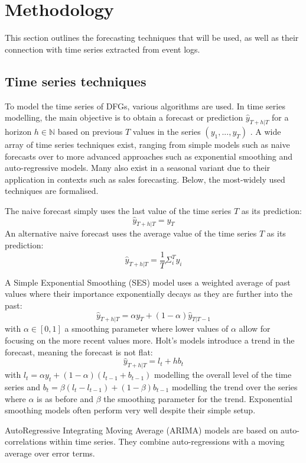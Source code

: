 \section{Methodology}\label{sec:methodology}
This section outlines the forecasting techniques that will be used, as well as their connection with time series extracted from event logs.

\subsection{Time series techniques}
To model the time series of DFGs, various algorithms are used.
In time series modelling, the main objective is to obtain a forecast or prediction $\hat{y}_{T+h|T}$ for a horizon $h\in \mathbb{N}$ based on previous $T$ values in the series $(y_1,...,y_T)$ \cite{hyndman2018forecasting}.
A wide array of time series techniques exist, ranging from simple models such as naive forecasts over to more advanced approaches such as exponential smoothing and auto-regressive models.
Many also exist in a seasonal variant due to their application in contexts such as sales forecasting.
Below, the most-widely used techniques are formalised.

The naive forecast simply uses the last value of the time series $T$ as its prediction:
\[\hat{y}_{T+h|T}=y_T\]
An alternative naive forecast uses the average value of the time series $T$ as its prediction:
\[\hat{y}_{T+h|T}=\frac{1}{T}\Sigma_i^{T} y_i\]

A Simple Exponential Smoothing (SES) model uses a weighted average of past values where their importance exponentially decays as they are further into the past:
\[\hat{y}_{T+h|T}=\alpha y_T + (1-\alpha)\hat{y}_{T|T-1}\]
with $\alpha \in [0,1]$ a smoothing parameter where lower values of $\alpha$ allow for focusing on the more recent values more.
Holt's models introduce a trend in the forecast, meaning the forecast is not flat:
\[\hat{y}_{T+h|T}=l_t + hb_t\]
with $l_t = \alpha y_t + (1-\alpha)(l_{t-1}+b_{t-1})$ modelling the overall level of the time series and $b_t=\beta(l_t-l_{t-1})+(1-\beta)b_{t-1}$ modelling the trend over the series where $\alpha$ is as before and $\beta$ the smoothing parameter for the trend.
Exponential smoothing models often perform very well despite their simple setup.

AutoRegressive Integrating Moving Average (ARIMA) models are based on auto-correlations within time series. 
They combine auto-regressions with a moving average over error terms.

